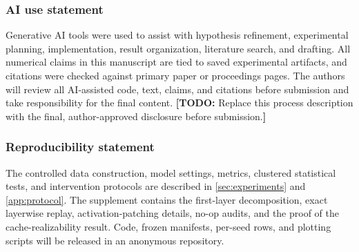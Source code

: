 \documentclass{article}
\newcommand{\todoexp}[1]{%
  \textcolor{todored}{\textbf{[TODO:} #1\textbf{]}}}
\begin{document}
\subsubsection*{AI use statement}
Generative AI tools were used to assist with hypothesis refinement,
experimental planning, implementation, result organization, literature
search, and drafting.  All numerical claims in this manuscript are tied to
saved experimental artifacts, and citations were checked against primary
paper or proceedings pages.  The authors will review all AI-assisted code,
text, claims, and citations before submission and take responsibility for the
final content.  \todoexp{Replace this process description with the final,
author-approved disclosure before submission.}

\subsubsection*{Reproducibility statement}
The controlled data construction, model settings, metrics, clustered
statistical tests, and intervention protocols are described in
\cref{sec:experiments} and \cref{app:protocol}.  The supplement contains the
first-layer decomposition, exact layerwise replay, activation-patching details,
no-op audits, and the proof of the cache-realizability result.  Code, frozen
manifests, per-seed rows, and plotting scripts will be released in an anonymous
repository.

\clearpage



\clearpage
\appendix

\end{document}
